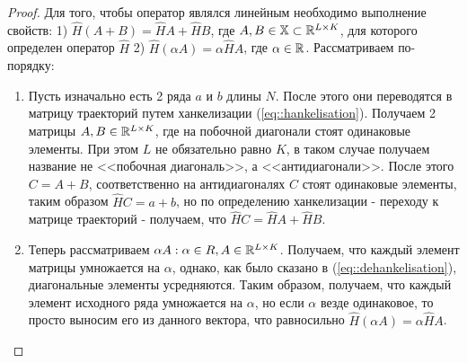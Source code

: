 \begin{proof}
	Для того, чтобы оператор являлся линейным необходимо выполнение свойств: 1) $\hat{H}(A + B) = \hat{H}A + \hat{H}B$, где $A, B \in \mathbb{X} \subset \mathbb{R}^{L \times K}$, для которого определен оператор $\hat{H}$ 2) $\hat{H}(\alpha A) = \alpha \hat{H}A$, где $\alpha \in \mathbb{R}$. Рассматриваем по-порядку:
	\begin{enumerate}
		\item Пусть изначально есть 2 ряда $a$ и $b$ длины $N$. После этого они переводятся в матрицу траекторий путем ханкелизации (\ref{eq::hankelisation}). Получаем 2 матрицы $A, B \in \mathbb{R}^{L \times K}$, где на побочной диагонали стоят одинаковые элементы. При этом $L$ не обязательно равно $K$, в таком случае получаем название не <<побочная диагональ>>, а <<антидиагонали>>. После этого $C = A + B$, соответственно на антидиагоналях $C$ стоят одинаковые элементы, таким образом $\hat{H}C = a + b$, но по определению ханкелизации - переходу к матрице траекторий - получаем, что $\hat{H}C = \hat{H}A + \hat{H}B$.
		\item Теперь рассматриваем $\alpha A: \alpha \in R, A \in \mathbb{R}^{L \times K}$. Получаем, что каждый элемент матрицы умножается на $\alpha$, однако, как было сказано в (\ref{eq::dehankelisation}), диагональные элементы усредняются. Таким образом, получаем, что каждый элемент исходного ряда умножается на $\alpha$, но если $\alpha$ везде одинаковое, то просто выносим его из данного вектора, что равносильно $\hat{H}(\alpha A) = \alpha \hat{H}A$.
	\end{enumerate}
\end{proof}

